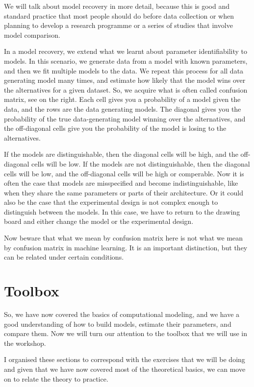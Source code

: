 \documentclass[12pt]{article}
\begin{document}
We will talk about model recovery in more detail, because this is good and standard practice that most people should do before data collection or when planning to develop a research programme or a series of studies that involve model comparison.

In a model recovery, we extend what we learnt about parameter identifiability to models. In this scenario, we generate data from a model with known parameters, and then we fit multiple models to the data. We repeat this process for all data generating model many times, and estimate how likely that the model wins over the alternatives for a given dataset. So, we acquire what is often called confusion matrix, see on the right. Each cell gives you a probability of a model given the data, and the rows are the data generating models. The diagonal gives you the probability of the true data-generating model winning over the alternatives, and the off-diagonal cells give you the probability of the model is losing to the alternatives.

If the models are distinguishable, then the diagonal cells will be high, and the off-diagonal cells will be low. If the models are not distinguishable, then the diagonal cells will be low, and the off-diagonal cells will be high or comperable. Now it is often the case that models are misspecified and become indistinguishable, like when they share the same parameters or parts of their architecture. Or it could also be the case that the experimental design is not complex enough to distinguish between the models. In this case, we have to return to the drawing board and either change the model or the experimental design.

Now beware that what we mean by confusion matrix here is not what we mean by confusion matrix in machine learning. It is an important distinction, but they can be related under certain conditions.


\section{Toolbox}

So, we have now covered the basics of computational modeling, and we have a good understanding of how to build models, estimate their parameters, and compare them. Now we will turn our attention to the toolbox that we will use in the workshop.

I organised these sections to correspond with the exercises that we will be doing and given that we have now covered most of the theoretical basics, we can move on to relate the theory to practice.
\end{document}
